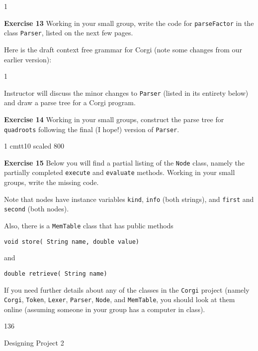  1
\border

{\bf Exercise 13}
Working in your small group, write the code for {\tt parseFactor} in
the class {\tt Parser}, listed on the next few pages.
\bigskip

Here is the draft context free grammar for Corgi (note some changes from our earlier version):
\medskip

{ \baselineskip
{}

\border}

 1

\vfil\eject

\doit  Instructor will discuss the minor changes to {\tt Parser} (listed in its entirety below)
and draw a parse tree for
a Corgi program.
\border

{\bf Exercise 14}
Working in your small groups, construct the parse tree for {\tt quadroots} following the final (I hope!)
version of {\tt Parser}.
\border

{\baselineskip
{} 1
\font \smalltt cmtt10 scaled 800
\border
}

{\bf Exercise 15}
Below you will find a partial listing of the {\tt Node} class, namely the partially completed
{\tt execute} and {\tt evaluate} methods.
Working in your small groups, 
write the missing code.
\medskip

Note that nodes have instance variables {\tt kind}, {\tt info} (both strings), and 
{\tt first} and {\tt second} (both nodes).
\medskip

Also, there is a {\tt MemTable} class that has public methods

 {\tt void store( String name, double value)}
 
and 

{\tt double retrieve( String name)} 
\medskip

If you need further details about any of the classes in the {\tt Corgi} project
(namely {\tt Corgi}, {\tt Token}, {\tt Lexer}, {\tt Parser}, {\tt Node}, and {\tt MemTable},
you should look at them online (assuming someone in your group has a computer in class).

\vfil\eject

 136

\vfil\eject

{\bigboldfont Designing Project 2}
\medskip

